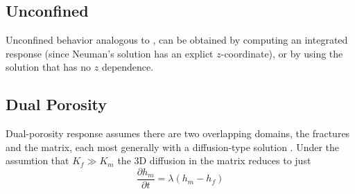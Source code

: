 \documentclass[12pt,letterpaper]{article}
\begin{document}
\subsection{Unconfined}
Unconfined behavior analogous to \cite{neuman1972theory}, can be
obtained by computing an integrated response (since Neuman's solution
has an explict $z$-coordinate), or by using the
\cite{boulton1954drawdown} solution that has no $z$ dependence.

\subsection{Dual Porosity}
Dual-porosity response assumes there are two overlapping domains, the
fractures and the matrix, each most generally with a diffusion-type
solution \cite{dougherty1984flow}.  Under the assumtion that $K_f \gg
K_m$ the 3D diffusion in the matrix reduces to just
\begin{equation}
  \label{eq:2}
  \frac{\partial h_m}{\partial t} = \lambda \left( h_m - h_f\right)
\end{equation}



\end{document}

